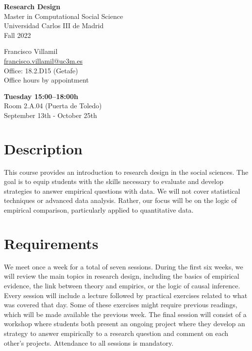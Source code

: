 \documentclass[12pt, a4paper]{article}
\begin{document}
\begin{center}
{\LARGE\bf Research Design}\\\vspace{10pt}
Master in Computational Social Science\\
Universidad Carlos III de Madrid\\\vspace{10pt}
{\large Fall 2022}\\
\end{center}

\vspace{20pt}

\begin{minipage}{0.49\textwidth}
\centering
Francisco Villamil\\
\href{francisco.villamil@uc3m.es}{francisco.villamil@uc3m.es}\\
Office: 18.2.D15 (Getafe)\\
Office hours by appointment
\end{minipage}\hfill
\begin{minipage}{0.49\textwidth}
\centering
\textbf{Tuesday 15:00--18:00h}\\Room 2.A.04 (Puerta de Toledo)\\September 13th - October 25th\\
\end{minipage}


\vspace{10pt}
\section{Description}

This course provides an introduction to research design in the social sciences.
The goal is to equip students with the skills necessary to evaluate and develop strategies to answer empirical questions with data.
We will not cover statistical techniques or advanced data analysis.
Rather, our focus will be on the logic of empirical comparison, particularly applied to quantitative data.

\section{Requirements}

We meet once a week for a total of seven sessions. During the first six weeks, we will review the main topics in research design, including the basics of empirical evidence, the link between theory and empirics, or the logic of causal inference. Every session will include a lecture followed by practical exercises related to what was covered that day. Some of these exercises might require previous readings, which will be made available the previous week. The final session will consist of a workshop where students both present an ongoing project where they develop an strategy to answer empirically to a research question and comment on each other's projects. Attendance to all sessions is mandatory.
\end{document}
